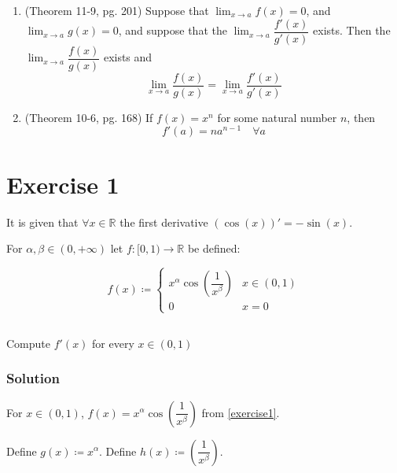 \documentclass{article}
\begin{document}
\begin{enumerate}
	\item (Theorem 11-9, pg. 201) Suppose that $\lim_{x \to a}f(x)=0$, and $\lim_{x \to a}g(x)=0$, and suppose that the $\lim_{x \to a}\dfrac{f'(x)}{g'(x)}$
	      exists. Then the $\lim_{x \to a}\dfrac{f(x)}{g(x)}$ exists and
	      \begin{equation}
		      \lim_{x \to a}\dfrac{f(x)}{g(x)}=\lim_{x \to a}\dfrac{f'(x)}{g'(x)} \label{le-medical-centre}
	      \end{equation}
	\item (Theorem 10-6, pg. 168) If $f(x)=x^n$ for some natural number $n$, then
	      \begin{equation}
		      f'(a)=na^{n-1} \quad \forall a \label{power-rule}
	      \end{equation}
\end{enumerate}


\section{Exercise 1}
It is given that $\forall x \in \mathbb{R}$ the first derivative $(\cos(x))' = -\sin(x)$.

For $\alpha, \beta \in (0,+\infty)$ let $f : [0,1) \to \mathbb{R}$ be defined:

\begin{equation}
	f(x) \coloneqq
	\begin{cases}
		x^{\alpha}\cos \left(\dfrac{1}{x^\beta}\right) & x \in (0,1) \\
		0                                              & x = 0
	\end{cases}
	\label{exercise1}
\end{equation}

\subsection{}
Compute $f'(x)$ for every $x \in (0,1)$

\subsubsection{Solution}

For $x \in (0,1)$, $f(x)=x^{\alpha}\cos \left(\dfrac{1}{x^\beta}\right)$ from \cref{exercise1}.

Define $g(x)\coloneq x^{\alpha}$. Define $h(x)\coloneq\left(\dfrac{1}{x^{\beta}}\right)$.
\end{document}
